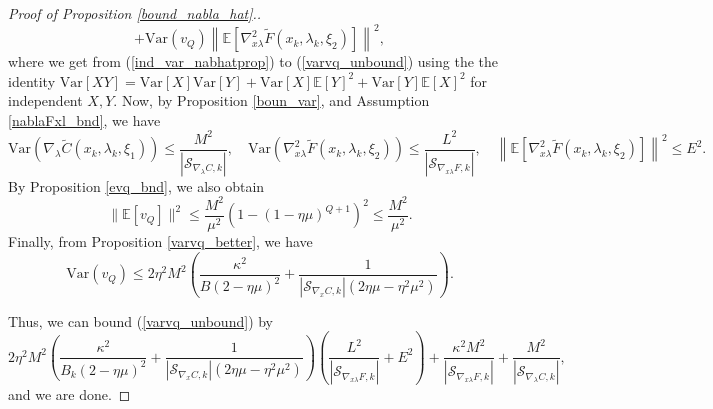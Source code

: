 \documentclass[11pt, twoside]{report}
\begin{document}
\begin{proof}[Proof of Proposition \ref{bound_nabla_hat}.]
\begin{equation} \label{varvq_unbound}
    + \mathrm{Var}\left(v_Q \right) \left\|\mathbb{E}\left[\nabla_{x \lambda}^2 \tilde{F}(x_k,\lambda_k,\xi_2)\right]\right\|^2,
\end{equation}
where we get from (\ref{ind_var_nabhatprop}) to (\ref{varvq_unbound}) using the the identity $\mathrm{Var}[XY] = \mathrm{Var}[X]\mathrm{Var}[Y] + \mathrm{Var}[X] \mathbb{E}[Y]^2 + \mathrm{Var}[Y] \mathbb{E}[X]^2$ for independent $X,Y$. Now, by Proposition \ref{boun_var}, and Assumption \ref{nablaFxl_bnd}, we have 
\[\mathrm{Var}\left(\nabla_\lambda \tilde{C}(x_k,\lambda_k,\xi_1) \right) \leq \frac{M^2}{|\mathcal{S}_{\nabla_{\lambda} C,k}|}, \quad \mathrm{Var}\left(\nabla_{x \lambda}^2 \tilde{F}(x_k,\lambda_k,\xi_2) \right) \leq \frac{L^2}{|\mathcal{S}_{\nabla_{x\lambda} F,k}|}, \quad \left\|\mathbb{E}\left[\nabla_{x \lambda}^2 \tilde{F}(x_k,\lambda_k,\xi_2)\right]\right\|^2 \leq E^2.\]
By Proposition \ref{evq_bnd}, we also obtain
\[\|\mathbb{E}[v_Q]\|^2 \leq \frac{M^2}{\mu^2}(1-(1-\eta\mu)^{Q+1})^2 \leq \frac{M^2}{\mu^2}.\]
Finally, from Proposition \ref{varvq_better}, we have
\[\mathrm{Var}(v_Q) \leq  2\eta^2M^2\left(\frac{\kappa^2}{B (2 - \eta \mu)^2} + \frac{1}{|\mathcal{S}_{\nabla_{x} C,k}|(2\eta \mu - \eta^2 \mu^2)} \right).\]

Thus, we can bound (\ref{varvq_unbound}) by 
\[2\eta^2M^2\left(\frac{\kappa^2}{B_k (2 - \eta \mu)^2} + \frac{1}{|\mathcal{S}_{\nabla_{x} C,k}|(2\eta \mu - \eta^2 \mu^2)} \right)\left(\frac{L^2}{|\mathcal{S}_{\nabla_{x\lambda} F,k}|} + E^2\right)  +  \frac{\kappa^2M^2}{|\mathcal{S}_{\nabla_{x\lambda} F,k}|}+ \frac{M^2}{|\mathcal{S}_{\nabla_{\lambda} C,k}|},\]
and we are done.

\end{proof}
\end{document}
